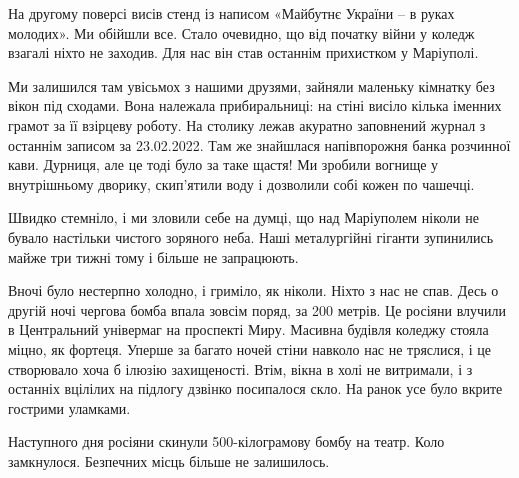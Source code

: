 На другому поверсі висів стенд із написом «Майбутнє України – в руках молодих».
Ми обійшли все. Стало очевидно, що від початку війни у коледж взагалі ніхто не
заходив. Для нас він став останнім прихистком у Маріуполі. 

Ми залишился там увісьмох з нашими друзями, зайняли маленьку кімнатку без вікон
під сходами. Вона належала прибиральниці: на стіні висіло кілька іменних грамот
за її взірцеву роботу. На столику лежав акуратно заповнений журнал з останнім
записом за 23.02.2022. Там же знайшлася напівпорожня банка розчинної кави.
Дурниця, але це тоді було за таке щастя! Ми зробили вогнище у внутрішньому
дворику, скип'ятили воду і дозволили собі кожен по чашечці.

Швидко стемніло, і ми зловили себе на думці, що над Маріуполем ніколи не бувало
настільки чистого зоряного неба. Наші металургійні гіганти зупинились майже три
тижні тому і більше не запрацюють.

Вночі було нестерпно холодно, і гриміло, як ніколи. Ніхто з нас не спав. Десь о
другій ночі чергова бомба впала зовсім поряд, за 200 метрів. Це росіяни влучили
в Центральний універмаг на проспекті Миру. Масивна будівля коледжу стояла
міцно, як фортеця. Уперше за багато ночей стіни навколо нас не тряслися, і це
створювало хоча б ілюзію захищеності. Втім, вікна в холі не витримали, і з
останніх вцілілих на підлогу дзвінко посипалося скло. На ранок усе було вкрите
гострими уламками.

Наступного дня росіяни скинули 500-кілограмову бомбу на театр. Коло замкнулося.
Безпечних місць більше не залишилось.

